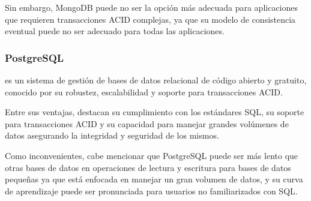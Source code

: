 Sin embargo, MongoDB puede no ser la opción más adecuada para aplicaciones que requieren transacciones ACID complejas, ya que su modelo de consistencia eventual puede no ser adecuado para todas las aplicaciones.

\subsubsection{PostgreSQL}
 es un sistema de gestión de bases de datos relacional de código abierto y gratuito, conocido por su robustez, escalabilidad y soporte para transacciones ACID.

Entre sus ventajas, destacan su cumplimiento con los estándares SQL, su soporte para transacciones ACID y su capacidad para manejar grandes volúmenes de datos asegurando la integridad y seguridad de los mismos.

Como inconvenientes, cabe mencionar que PostgreSQL puede ser más lento que otras bases de datos en operaciones de lectura y escritura para bases de datos pequeñas ya que está enfocada en manejar un gran volumen de datos,
 y su curva de aprendizaje puede ser pronunciada para usuarios no familiarizados con SQL.

